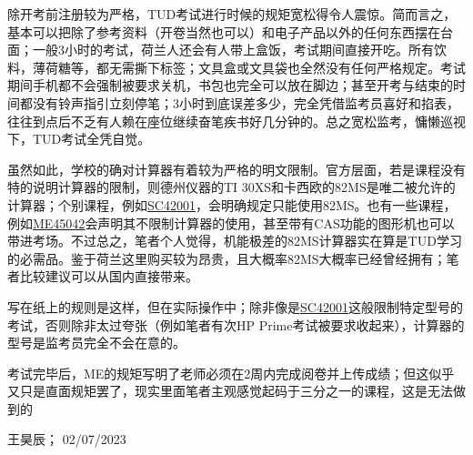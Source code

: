 除开考前注册较为严格，TUD考试进行时候的规矩宽松得令人震惊。简而言之，基本可以把除了参考资料（开卷当然也可以）和电子产品以外的任何东西摆在台面；一般3小时的考试，荷兰人还会有人带上盒饭，考试期间直接开吃。所有饮料，薄荷糖等，都无需撕下标签；文具盒或文具袋也全然没有任何严格规定。考试期间手机都不会强制被要求关机，书包也完全可以放在脚边；甚至开考与结束的时间都没有铃声指引立刻停笔；3小时到底误差多少，完全凭借监考员喜好和掐表，往往到点后不乏有人赖在座位继续奋笔疾书好几分钟的。总之宽松监考，慵懒巡视下，TUD考试全凭自觉。

虽然如此，学校的确对计算器有着较为严格的明文限制。官方层面，若是课程没有特的说明计算器的限制，则德州仪器的TI 30XS和卡西欧的82MS是唯二被允许的计算器；个别课程，例如\hyperlink{control}{\uline{SC42001}}，会明确规定只能使用82MS。也有一些课程，例如\hyperlink{AFD}{\uline{ME45042}}会声明其不限制计算器的使用，甚至带有CAS功能的图形机也可以带进考场。不过总之，笔者个人觉得，机能极差的82MS计算器实在算是TUD学习的必需品。鉴于荷兰这里购买较为昂贵，且大概率82MS大概率已经曾经拥有；笔者比较建议可以从国内直接带来。

写在纸上的规则是这样，但在实际操作中；除非像是\hyperlink{control}{\uline{SC42001}}这般限制特定型号的考试，否则除非太过夸张（例如笔者有次HP Prime考试被要求收起来），计算器的型号是监考员完全不会在意的。

考试完毕后，ME的规矩写明了老师必须在2周内完成阅卷并上传成绩；但这似乎又只是直面规矩罢了，现实里面笔者主观感觉起码于三分之一的课程，这是无法做到的
\begin{flushright}
王昊辰； 02/07/2023
\end{flushright}

